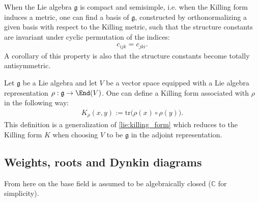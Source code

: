     \begin{property}
        When the Lie algebra $\mathfrak{g}$ is compact and semisimple, i.e. when the Killing form induces a metric, one can find a basis of $\mathfrak{g}$, constructed by orthonormalizing a given basis with respect to the Killing metric, such that the structure constants are invariant under cyclic permutation of the indices:
        \begin{gather}
            c_{ijk} = c_{jki}.
        \end{gather}
        A corollary of this property is also that the structure constants become totally antisymmetric.
    \end{property}

    \begin{construct}
        Let $\mathfrak{g}$ be a Lie algebra and let $V$ be a vector space equipped with a Lie algebra representation $\rho:\mathfrak{g}\rightarrow\End(V)$. One can define a Killing form associated with $\rho$ in the following way:
        \begin{gather}
            \label{lie:rho_killing_form}
            K_\rho(x,y) := \mathrm{tr}\big(\rho(x)\circ\rho(y)\big).
        \end{gather}
        This definition is a generalization of \eqref{lie:killing_form} which reduces to the Killing form $K$ when choosing $V$ to be $\mathfrak{g}$ in the adjoint representation.
    \end{construct}

\subsection{Weights, roots and Dynkin diagrams}

    From here on the base field is assumed to be algebraically closed ($\mathbb{C}$ for simplicity).


